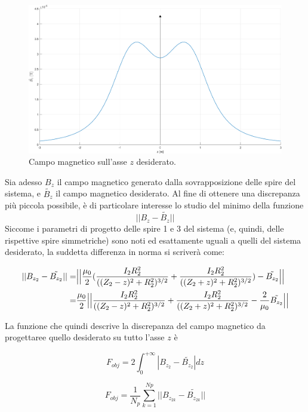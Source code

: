 \documentclass[a4paper, 11pt]{article}
\begin{document}
\begin{figure}[H]
    \centering
    \includegraphics[width=16cm]{assets/figure2}
    \caption{Campo magnetico sull'asse $z$ desiderato.}
\end{figure}
\noindent
Sia adesso $B_{z}$ il campo magnetico generato dalla sovrapposizione delle spire
del sistema, e $\tilde{B_{z}}$ il campo magnetico desiderato. Al fine di
ottenere una discrepanza più piccola possibile, è di particolare interesse lo
studio del minimo della funzione
\[||B_{z}-\tilde{B_{z}}||\] Siccome i parametri di progetto delle spire 1 e 3
del sistema (e, quindi, delle rispettive spire simmetriche) sono noti ed
esattamente uguali a quelli del sistema desiderato, la suddetta differenza in
norma si scriverà come:

\begin{equation}
    \begin{split}
        ||B_{z_{2}}-\tilde{B_{z_{2}}}||
        =& \Bigl|\Bigl|\frac{\mu_{0}}{2}(\frac{I_{2}R_{2}^{2}}{((Z_{2}-z)^{2}+R_{2}^{2})^{3/2}}+\frac{I_{2}R_{2}^{2}}{((Z_{2}+z)^{2}+R_{2}^{2})^{3/2}})-\tilde{B_{z_{2}}}\Bigr|\Bigr| \\
        =& \frac{\mu_{0}}{2}\Bigl|\Bigl|\frac{I_{2}R_{2}^{2}}{((Z_{2}-z)^{2}+R_{2}^{2})^{3/2}}+\frac{I_{2}R_{2}^{2}}{((Z_{2}+z)^{2}+R_{2}^{2})^{3/2}}-\frac{2}{\mu_{0}}\tilde{B_{z_{2}}}\Bigr|\Bigr|
    \end{split} 
\end{equation}

\noindent
La funzione che quindi descrive la discrepanza del campo magnetico da progettaree
quello desiderato su tutto l'asse $z$ è 

\[F_{obj}=2\int_{0}^{+\infty}|B_{z_{2}}-\tilde{B_{z_{2}}}|dz\]

\[F_{obj}=\frac{1}{N_{p}}\sum\limits_{k=1}^{Np} ||B_{z_{2k}}-\tilde{B_{z_{2k}}}||\]
\end{document}
